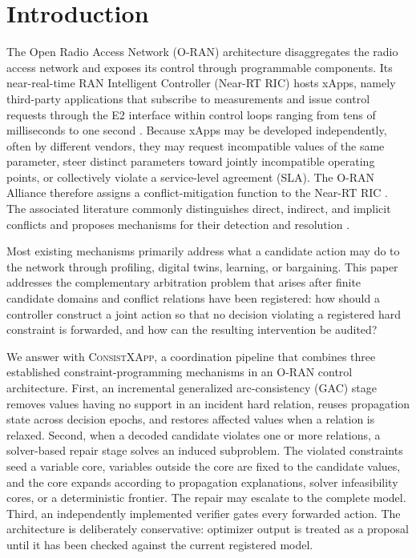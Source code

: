 \documentclass[pdflatex,sn-mathphys-num,iicol,oneside]{sn-jnl}
\newcommand{\method}{\textsc{ConsistXApp}\xspace}
\newcommand{\gac}{\textsc{GAC}\xspace}
\begin{document}

\maketitle

\section{Introduction}
\label{sec:introduction}

The Open Radio Access Network (O-RAN) architecture disaggregates the
radio access network and exposes its control through programmable
components. Its near-real-time RAN Intelligent Controller (Near-RT
RIC) hosts xApps, namely third-party applications that subscribe to
measurements and issue control requests through the E2 interface
within control loops ranging from tens of milliseconds to one second
\cite{polese2023oran}. Because xApps may be developed independently,
often by different vendors, they may request incompatible values of
the same parameter, steer distinct parameters toward jointly
incompatible operating points, or collectively violate a
service-level agreement (SLA). The O-RAN Alliance therefore assigns a
conflict-mitigation function to the Near-RT RIC
\cite{oran2024conflict}. The associated literature commonly
distinguishes direct, indirect, and implicit conflicts and proposes
mechanisms for their detection and resolution
\cite{adamczyk2023conflict,wadud2024qacm}.

Most existing mechanisms primarily address what a candidate action
may do to the network through profiling, digital twins, learning, or
bargaining. This paper addresses the complementary arbitration
problem that arises after finite candidate domains and conflict
relations have been registered: how should a controller construct a
joint action so that no decision violating a registered hard
constraint is forwarded, and how can the resulting intervention be
audited?

We answer with \method, a coordination pipeline that combines three
established constraint-programming mechanisms in an O-RAN control
architecture. First, an incremental generalized arc-consistency
(\gac) stage removes values having no support in an incident hard
relation, reuses propagation state across decision epochs, and
restores affected values when a relation is relaxed. Second, when a
decoded candidate violates one or more relations, a solver-based
repair stage solves an induced subproblem. The violated constraints
seed a variable core, variables outside the core are fixed to the
candidate values, and the core expands according to propagation
explanations, solver infeasibility cores, or a deterministic frontier.
The repair may escalate to the complete model. Third, an independently
implemented verifier gates every forwarded action. The architecture is
deliberately conservative: optimizer output is treated as a proposal
until it has been checked against the current registered model.
\end{document}
